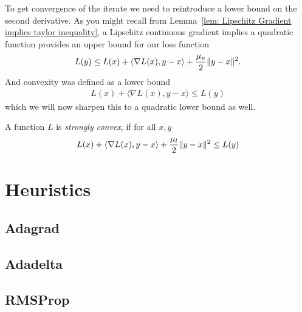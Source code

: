 To get convergence of the iterate we need to reintroduce a lower bound on
the second derivative. As you might recall from Lemma~\ref{lem: Lipschitz
Gradient implies taylor inequality}, a Lipschitz continuous gradient implies
a quadratic function provides an upper bound for our loss function
%
\begin{align*}
	L(y) \le L(x) + \langle \nabla L(x), y-x\rangle + \frac{\mu_u}{2}\|y-x\|^2.
\end{align*}
%
And convexity was defined as a lower bound
%
\begin{align*}
	L(x) + \langle \nabla L(x), y-x\rangle \le L(y)
\end{align*}
%
which we will now sharpen this to a quadratic lower bound as well.
%
\begin{definition}
	A function \(L\) is \emph{strongly convex}, if for all \(x,y\)
	\begin{align*}
		L(x) + \langle \nabla L(x), y-x\rangle + \frac{\mu_l}{2}\|y-x\|^2 \le L(y)
	\end{align*}
\end{definition}



\section{Heuristics}

\subsection{Adagrad}

\subsection{Adadelta}

\subsection{RMSProp}


\endinput